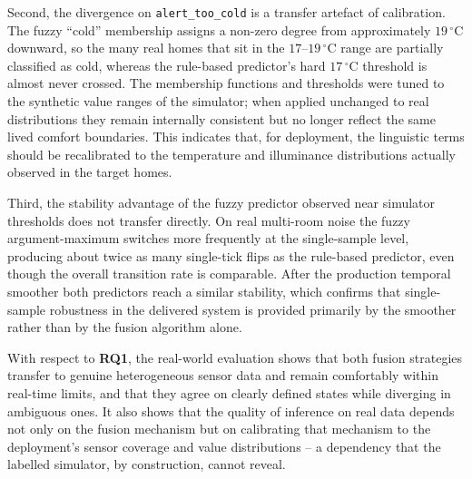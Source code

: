 Second, the divergence on \texttt{alert\_too\_cold} is a transfer artefact of
calibration. The fuzzy ``cold'' membership assigns a non-zero degree from
approximately $19\,^{\circ}\text{C}$ downward, so the many real homes that sit in
the $17$--$19\,^{\circ}\text{C}$ range are partially classified as cold, whereas
the rule-based predictor's hard $17\,^{\circ}\text{C}$ threshold is almost never
crossed.
The membership functions and thresholds were tuned to the synthetic value ranges
of the simulator; when applied unchanged to real distributions they remain
internally consistent but no longer reflect the same lived comfort boundaries.
This indicates that, for deployment, the linguistic terms should be recalibrated
to the temperature and illuminance distributions actually observed in the target
homes.

Third, the stability advantage of the fuzzy predictor observed near simulator
thresholds does not transfer directly. On real multi-room noise the fuzzy
argument-maximum switches more frequently at the single-sample level, producing
about twice as many single-tick flips as the rule-based predictor, even though the
overall transition rate is comparable. After the production temporal smoother both
predictors reach a similar stability, which confirms that single-sample
robustness in the delivered system is provided primarily by the smoother rather
than by the fusion algorithm alone.

With respect to \textbf{RQ1}, the real-world evaluation shows that both fusion
strategies transfer to genuine heterogeneous sensor data and remain comfortably
within real-time limits, and that they agree on clearly defined states while
diverging in ambiguous ones. It also shows that the quality of inference on real
data depends not only on the fusion mechanism but on calibrating that mechanism to
the deployment's sensor coverage and value distributions -- a dependency that the
labelled simulator, by construction, cannot reveal.

